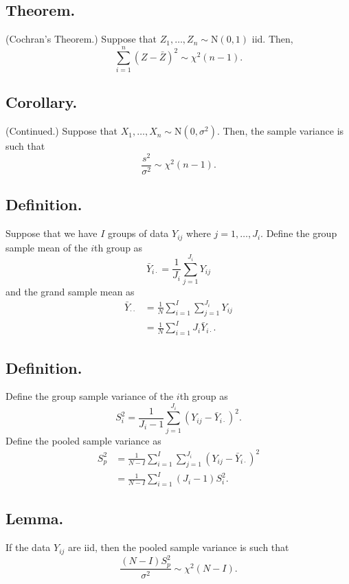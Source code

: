 \documentclass[titlepage]{article}
\begin{document}
\subsection{Theorem.} (Cochran's Theorem.) Suppose that $Z_{1}, \ldots, Z_{n} \sim \text{N}(0, 1)$ iid. Then,
$$\sum_{i=1}^{n}(Z-\bar{Z})^{2} \sim \chi^{2}(n-1).$$

\subsection{Corollary.} (Continued.) Suppose that $X_{1}, \ldots, X_{n} \sim \text{N}(0, \sigma^{2})$. Then, the sample variance is such that 
$$\frac{s^{2}}{\sigma^{2}} \sim \chi^{2}(n-1).$$

\subsection{Definition.} Suppose that we have $I$ groups of data $Y_{ij}$ where $j = 1, \ldots, J_{i}$. Define the group sample mean of the $i$th group as 
$$\bar{Y}_{i\cdot} = \frac{1}{J_{i}}\sum_{j=1}^{J_{i}}Y_{ij}$$
and the grand sample mean as 
\begin{align*}
    \bar{Y}_{\cdot\cdot} &= \frac{1}{N}\sum_{i=1}^{I}\sum_{j=1}^{J_{i}}Y_{ij} \\
                         &= \frac{1}{N}\sum_{i=1}^{I}J_{i}\bar{Y}_{i\cdot}.
\end{align*}

\subsection{Definition.} Define the group sample variance of the $i$th group as 
$$S_{i}^{2} = \frac{1}{J_{i}-1}\sum_{j=1}^{J_{i}}(Y_{ij} - \bar{Y}_{i\cdot})^{2}.$$
Define the pooled sample variance as 
\begin{align*}
    S_{p}^{2} &= \frac{1}{N-I}\sum_{i=1}^{I}\sum_{j=1}^{J_{i}}(Y_{ij} - \bar{Y}_{i\cdot})^{2} \\
              &= \frac{1}{N-I}\sum_{i=1}^{I}(J_{i}-1)S_{i}^{2}.
\end{align*}

\subsection{Lemma.} If the data $Y_{ij}$ are iid, then the pooled sample variance is such that 
$$\frac{(N-I)S_{p}^{2}}{\sigma^{2}} \sim \chi^{2}(N-I).$$
\end{document}
